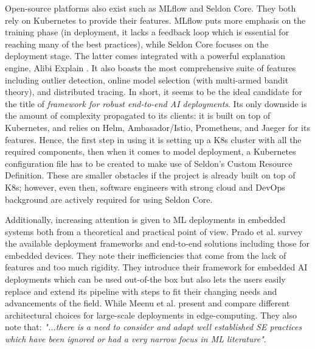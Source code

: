Open-source platforms also exist such as MLflow and Seldon Core. They both rely on Kubernetes to provide their features. MLflow puts more emphasis on the training phase (in deployment, it lacks a feedback loop which is essential for reaching many of the best practices), while Seldon Core focuses on the deployment stage. The latter comes integrated with a powerful explanation engine, Alibi Explain \cite{klaise2021alibi}. It also boasts the most comprehensive suite of features including outlier detection, online model selection (with multi-armed bandit theory), and distributed tracing. In short, it seems to be the ideal candidate for the title of \textit{framework for robust end-to-end AI deployments}. Its only downside is the amount of complexity propagated to its clients: it is built on top of Kubernetes, and relies on Helm, Ambasador/Istio, Prometheus, and Jaeger for its features. Hence, the first step in using it is setting up a K8s cluster with all the required components, then when it comes to model deployment, a Kubernetes configuration file has to be created to make use of Seldon's Custom Resource Definition. These are smaller obstacles if the project is already built on top of K8s; however, even then, software engineers with strong cloud and DevOps background are actively required for using Seldon Core.

Additionally, increasing attention is given to ML deployments in embedded systems both from a theoretical \cite{john2020ai} and practical \cite{prado2020bonseyes} point of view. Prado et al. \cite{prado2020bonseyes} survey the available deployment frameworks and end-to-end solutions including those for embedded devices. They note their inefficiencies that come from the lack of features and too much rigidity. They introduce their framework for embedded AI deployments which can be used out-of-the box but also lets the users easily replace and extend its pipeline with steps to fit their changing needs and advancements of the field. While Meenu et al. \cite{john2020ai} present and compare different architectural choices for large-scale deployments in edge-computing. They also note that: \textit{"...there is a need to consider and adapt well established SE practices which have been ignored or had a very narrow focus in ML literature"}.

